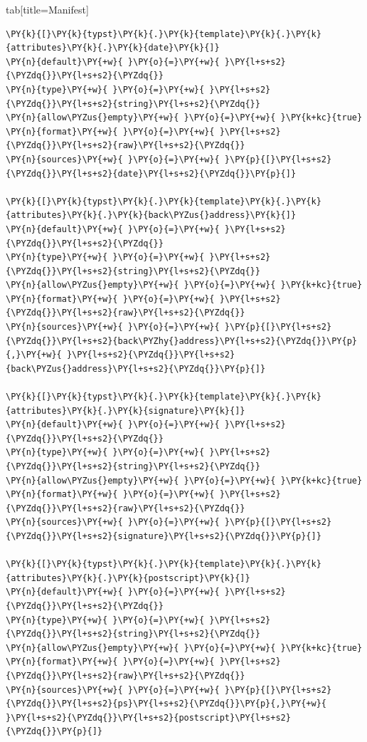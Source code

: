 \documentclass[a4paper,twoside]{article}
\begin{document}
\begin{tsdiv}{tab}[title=Manifest]
\begin{tscode}[lang=toml, engine=pygments]
\begin{Verbatim}[commandchars=\\\{\},breaklines, breakanywhere, commandchars=\\\{\}]
\PY{k}{[}\PY{k}{typst}\PY{k}{.}\PY{k}{template}\PY{k}{.}\PY{k}{attributes}\PY{k}{.}\PY{k}{date}\PY{k}{]}
\PY{n}{default}\PY{+w}{ }\PY{o}{=}\PY{+w}{ }\PY{l+s+s2}{\PYZdq{}}\PY{l+s+s2}{\PYZdq{}}
\PY{n}{type}\PY{+w}{ }\PY{o}{=}\PY{+w}{ }\PY{l+s+s2}{\PYZdq{}}\PY{l+s+s2}{string}\PY{l+s+s2}{\PYZdq{}}
\PY{n}{allow\PYZus{}empty}\PY{+w}{ }\PY{o}{=}\PY{+w}{ }\PY{k+kc}{true}
\PY{n}{format}\PY{+w}{ }\PY{o}{=}\PY{+w}{ }\PY{l+s+s2}{\PYZdq{}}\PY{l+s+s2}{raw}\PY{l+s+s2}{\PYZdq{}}
\PY{n}{sources}\PY{+w}{ }\PY{o}{=}\PY{+w}{ }\PY{p}{[}\PY{l+s+s2}{\PYZdq{}}\PY{l+s+s2}{date}\PY{l+s+s2}{\PYZdq{}}\PY{p}{]}

\PY{k}{[}\PY{k}{typst}\PY{k}{.}\PY{k}{template}\PY{k}{.}\PY{k}{attributes}\PY{k}{.}\PY{k}{back\PYZus{}address}\PY{k}{]}
\PY{n}{default}\PY{+w}{ }\PY{o}{=}\PY{+w}{ }\PY{l+s+s2}{\PYZdq{}}\PY{l+s+s2}{\PYZdq{}}
\PY{n}{type}\PY{+w}{ }\PY{o}{=}\PY{+w}{ }\PY{l+s+s2}{\PYZdq{}}\PY{l+s+s2}{string}\PY{l+s+s2}{\PYZdq{}}
\PY{n}{allow\PYZus{}empty}\PY{+w}{ }\PY{o}{=}\PY{+w}{ }\PY{k+kc}{true}
\PY{n}{format}\PY{+w}{ }\PY{o}{=}\PY{+w}{ }\PY{l+s+s2}{\PYZdq{}}\PY{l+s+s2}{raw}\PY{l+s+s2}{\PYZdq{}}
\PY{n}{sources}\PY{+w}{ }\PY{o}{=}\PY{+w}{ }\PY{p}{[}\PY{l+s+s2}{\PYZdq{}}\PY{l+s+s2}{back\PYZhy{}address}\PY{l+s+s2}{\PYZdq{}}\PY{p}{,}\PY{+w}{ }\PY{l+s+s2}{\PYZdq{}}\PY{l+s+s2}{back\PYZus{}address}\PY{l+s+s2}{\PYZdq{}}\PY{p}{]}

\PY{k}{[}\PY{k}{typst}\PY{k}{.}\PY{k}{template}\PY{k}{.}\PY{k}{attributes}\PY{k}{.}\PY{k}{signature}\PY{k}{]}
\PY{n}{default}\PY{+w}{ }\PY{o}{=}\PY{+w}{ }\PY{l+s+s2}{\PYZdq{}}\PY{l+s+s2}{\PYZdq{}}
\PY{n}{type}\PY{+w}{ }\PY{o}{=}\PY{+w}{ }\PY{l+s+s2}{\PYZdq{}}\PY{l+s+s2}{string}\PY{l+s+s2}{\PYZdq{}}
\PY{n}{allow\PYZus{}empty}\PY{+w}{ }\PY{o}{=}\PY{+w}{ }\PY{k+kc}{true}
\PY{n}{format}\PY{+w}{ }\PY{o}{=}\PY{+w}{ }\PY{l+s+s2}{\PYZdq{}}\PY{l+s+s2}{raw}\PY{l+s+s2}{\PYZdq{}}
\PY{n}{sources}\PY{+w}{ }\PY{o}{=}\PY{+w}{ }\PY{p}{[}\PY{l+s+s2}{\PYZdq{}}\PY{l+s+s2}{signature}\PY{l+s+s2}{\PYZdq{}}\PY{p}{]}

\PY{k}{[}\PY{k}{typst}\PY{k}{.}\PY{k}{template}\PY{k}{.}\PY{k}{attributes}\PY{k}{.}\PY{k}{postscript}\PY{k}{]}
\PY{n}{default}\PY{+w}{ }\PY{o}{=}\PY{+w}{ }\PY{l+s+s2}{\PYZdq{}}\PY{l+s+s2}{\PYZdq{}}
\PY{n}{type}\PY{+w}{ }\PY{o}{=}\PY{+w}{ }\PY{l+s+s2}{\PYZdq{}}\PY{l+s+s2}{string}\PY{l+s+s2}{\PYZdq{}}
\PY{n}{allow\PYZus{}empty}\PY{+w}{ }\PY{o}{=}\PY{+w}{ }\PY{k+kc}{true}
\PY{n}{format}\PY{+w}{ }\PY{o}{=}\PY{+w}{ }\PY{l+s+s2}{\PYZdq{}}\PY{l+s+s2}{raw}\PY{l+s+s2}{\PYZdq{}}
\PY{n}{sources}\PY{+w}{ }\PY{o}{=}\PY{+w}{ }\PY{p}{[}\PY{l+s+s2}{\PYZdq{}}\PY{l+s+s2}{ps}\PY{l+s+s2}{\PYZdq{}}\PY{p}{,}\PY{+w}{ }\PY{l+s+s2}{\PYZdq{}}\PY{l+s+s2}{postscript}\PY{l+s+s2}{\PYZdq{}}\PY{p}{]}


\end{Verbatim}
\end{tscode}
\end{tsdiv}
\end{document}
